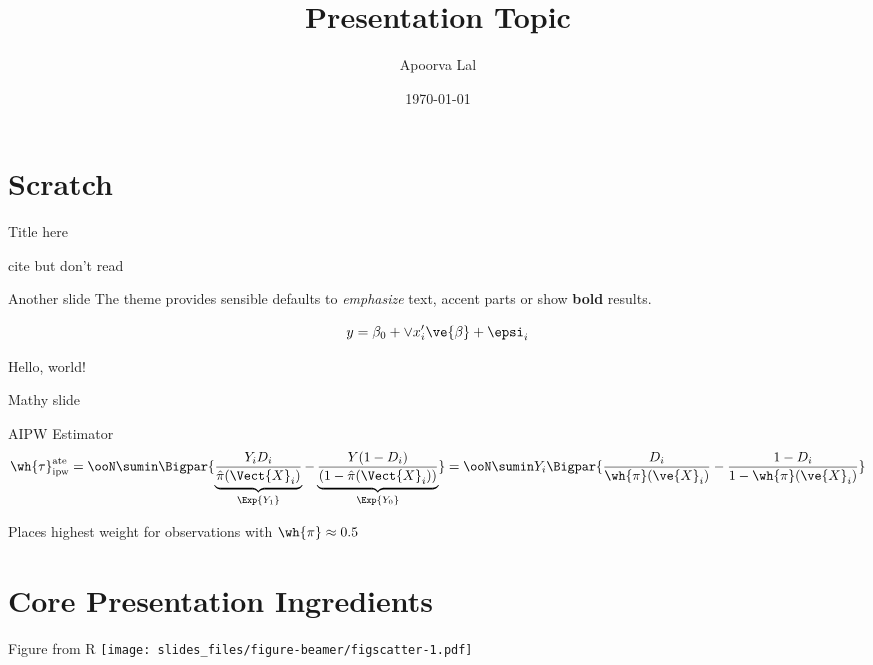 \documentclass[ignorenonframetext,]{beamer}
\title[]{Presentation Topic}
\author[
        Apoorva Lal
    ]{Apoorva Lal}
\institute[
    ]{
    Stanford
    }
\date[
      \today
  ]{
      \today
        }
\begin{document}
  \begin{frame}[plain]
  \titlepage
  \end{frame}


  \begin{frame}
  \tableofcontents[hideallsubsections]
  \end{frame}

\hypertarget{scratch}{%
\section{Scratch}\label{scratch}}

\begin{frame}{Title here}
\protect\hypertarget{title-here}{}
\parencite{leamer1983let}

\scriptsize cite but don't read
\end{frame}

\begin{frame}{Another slide}
\protect\hypertarget{another-slide}{}
The theme provides sensible defaults to \emph{emphasize} text,
\alert{accent} parts or show \textbf{bold} results.

\[
y = \beta_0 + \vee{x}_i' \ve{\beta} + \epsi_i
\]

Hello, world!
\end{frame}

\begin{frame}{Mathy slide}
\protect\hypertarget{mathy-slide}{}
\begin{alertblock}{AIPW Estimator}
$$
\wh{\tau}_{\text{ipw}}^{\text{ate}} = \ooN \sumin \Bigpar{
  \underbrace{\frac{Y_iD_i}{\hat{\pi}(\Vect{X}_i)}}_{\Exp{Y_1}} -
  \underbrace{\frac{Y(1 - D_i)}{(1 - \hat{\pi}(\Vect{X}_i))}}_{\Exp{Y_0}}}
= \ooN \sumin Y_i \Bigpar{\frac{D_i}{\wh{\pi}(\ve{X}_i)} - \frac{1 -
D_i}{1 - \wh{\pi} (\ve{X}_i)}}
$$

\end{alertblock}

Places highest weight for observations with \(\wh{\pi} \approx 0.5\)
\end{frame}

\hypertarget{core-presentation-ingredients}{%
\section{Core Presentation
Ingredients}\label{core-presentation-ingredients}}

\begin{frame}{Figure from R}
\protect\hypertarget{figure-from-r}{}
\texttt{[image: slides\_files/figure-beamer/figscatter-1.pdf]}
\end{frame}
\end{document}
